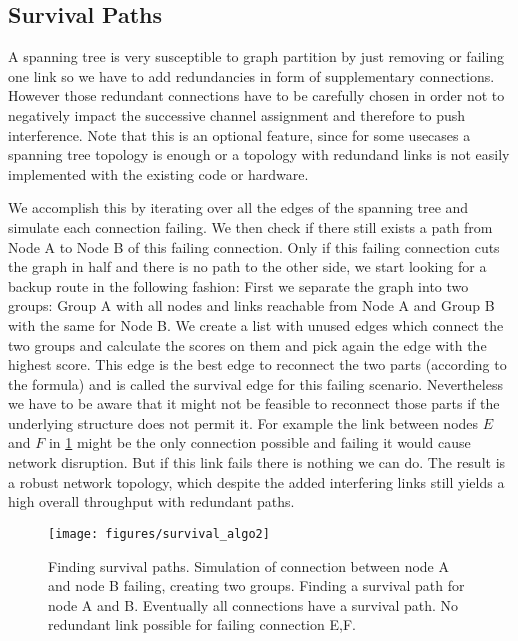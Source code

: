     \subsection{Survival Paths}
      A spanning tree is very susceptible to graph partition by just removing or failing one link so we have to add redundancies in form of supplementary connections.
      However those redundant connections have to be carefully chosen in order not to negatively impact the successive channel assignment and therefore to push interference.
      Note that this is an optional feature, since for some usecases a spanning tree topology is enough or a topology with redundand links is not easily implemented
      with the existing code or hardware.  
      
      We accomplish this by iterating over all the edges of the spanning tree and simulate each connection failing. We then check if there still exists 
      a path from Node A to Node B of this failing connection. Only if this failing connection cuts the graph in half and there is no path to the other side,
      we start looking for a backup route in the following fashion:
      First we separate the graph into two groups: Group A with all nodes and links reachable from Node A and Group B with the same for Node B.
      We create a list with unused edges which connect the two groups and calculate the scores on them and pick again the edge with the highest score.
      This edge is the best edge to reconnect the two parts (according to the formula) and is called the survival edge for this failing scenario.
      Nevertheless we have to be aware that it might not be feasible to reconnect those parts if the underlying structure does not permit it.
      For example the link between nodes \(E\) and \(F\) in \ref{fig:survival_algo} might be the only connection possible and failing it would cause network disruption.
      But if this link fails there is nothing we can do. The result is a robust network topology, 
      which despite the added interfering links still yields a high overall throughput with redundant paths.
      
      \begin{figure}[h!]
	\centering
	\texttt{[image: figures/survival\_algo2]}
	\caption{Finding survival paths. Simulation of connection between node A and node B failing, creating two groups.
	  Finding a survival path for node A and B. Eventually all connections have a survival path. No redundant link possible for failing connection E,F.}
	\label{fig:survival_algo}
      \end{figure}
      
